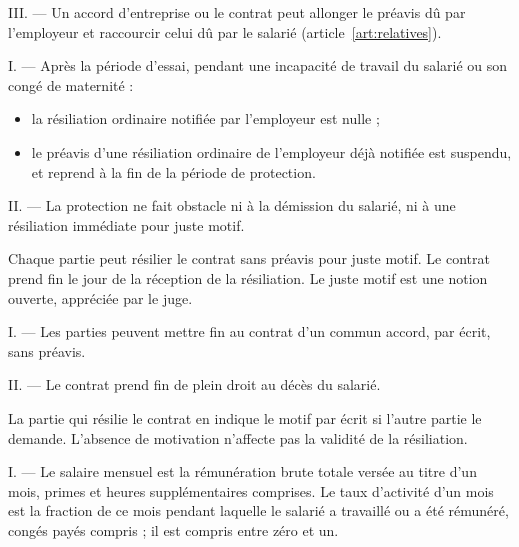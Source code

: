 III. --- Un accord d'entreprise ou le contrat peut allonger le préavis dû par
l'employeur et raccourcir celui dû par le salarié
(article~\ref{art:relatives}).

\label{art:protection}
I. --- Après la période d'essai, pendant une incapacité de travail du salarié
ou son congé de maternité :
\begin{itemize}
  \item la résiliation ordinaire notifiée par l'employeur est nulle ;
  \item le préavis d'une résiliation ordinaire de l'employeur déjà notifiée
        est suspendu, et reprend à la fin de la période de protection.
\end{itemize}

II. --- La protection ne fait obstacle ni à la démission du salarié, ni à
une résiliation immédiate pour juste motif.


\label{art:resiliation-immediate}
Chaque partie peut résilier le contrat sans préavis pour juste motif. Le
contrat prend fin le jour de la réception de la résiliation. Le juste motif
est une notion ouverte, appréciée par le juge.

\label{art:accord-deces}
I. --- Les parties peuvent mettre fin au contrat d'un commun accord, par écrit,
sans préavis.

II. --- Le contrat prend fin de plein droit au décès du salarié.

\label{art:motivation}
La partie qui résilie le contrat en indique le motif par écrit si l'autre
partie le demande. L'absence de motivation n'affecte pas la validité de la
résiliation.

\label{art:salaire-reference}
I. --- Le salaire mensuel est la rémunération brute totale versée au titre
d'un mois, primes et heures supplémentaires comprises. Le taux d'activité d'un
mois est la fraction de ce mois pendant laquelle le salarié a travaillé ou a été
rémunéré, congés payés compris ; il est compris entre zéro et un.

